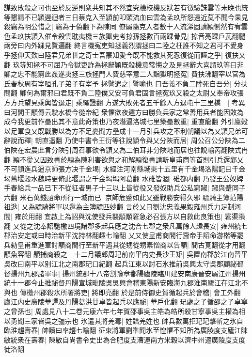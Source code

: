 謀致敗殺之可也至於反逆則衆共知其不然宜究檢校機反狀若有徵驗誅雲等未晩也統等懇請不已頴遲迴者三日蔡克入至頴前叩頭流血曰雲為孟玖所怨遠近莫不聞今果見殺竊為明公惜之|{
	竊為于偽翻下為陳同}
僚屬隨克入者數十人流涕固請頴惻然有宥雲色孟玖扶頴入催令殺雲耽夷機三族獄吏考掠孫拯數百兩踝骨見|{
	掠音亮踝戶瓦翻腿兩旁曰内外踝見賢遍翻}
終言機寃吏知拯義烈謂拯曰二陸之枉誰不知之君可不愛身乎拯仰天歎曰陸君兄弟世之奇士吾蒙知愛今既不能救其死忍復從而誣之乎|{
	復扶又翻}
玖等知拯不可屈乃令獄吏詐為拯辭頴既殺機意常悔之及見拯辭大喜謂玖等曰非卿之忠不能窮此姦遂夷拯三族拯門人費慈宰意二人詣獄明拯寃|{
	費扶沸翻宰以官為氏春秋周有宰咺孔子弟子有宰予}
拯譬遣之|{
	譬喻也}
曰吾義不負二陸死自吾分|{
	分扶問翻}
卿何為爾邪曰君既不負二陸僕又安可負君固言拯寃玖又殺之太尉乂奉帝攻張方方兵望見乘輿皆退走|{
	乘繩證翻}
方遂大敗死者五千餘人方退屯十三里橋　|{
	考異曰河間王顒傳云駛水橋今從帝紀}
衆懼欲夜遁方曰勝負兵家之常善用兵者能因敗為成今我更前作壘出其不意此奇策也乃夜潛逼洛城七里築壘數重|{
	重直龍翻}
外引廩穀以足軍食乂既戰勝以為方不足憂聞方壘成十一月引兵攻之不利朝議以為乂頴兄弟可辭說而釋|{
	朝直遥翻}
乃使中書令王衍等往說頴令與乂分陜而居|{
	周公召公分陜為二伯陜在宏農此言分陜引周召事欲令頴乂為二伯耳非分陜地而居也往說輸芮翻陜式冉翻}
頴不從乂因致書於頴為陳利害欲與之和解頴復書請斬皇甫商等首則引兵還鄴乂不可頴進兵逼京師張方决千金堨|{
	水經注河南縣城東十五里有千金堨洛陽記曰千金堨舊堰穀水魏時更脩此堰謂之千金堨堨阿葛翻}
水碓皆涸|{
	碓都内翻}
乃發王公奴婢手舂給兵一品已下不從征者男子十三以上皆從役又發奴助兵公私窮踧|{
	踧與蹙同子六翻}
米石萬錢詔命所行一城而已|{
	京師危蹙如此乂雖戰勝安得久邪}
驃騎主簿范陽祖逖|{
	乂為驃騎將軍以逖為主簿驃匹妙翻}
言於乂曰劉沈忠義果毅雍州兵力足制河間|{
	雍於用翻}
宜啟上為詔與沈使發兵襲顒顒窘急必召張方以自救此良策也|{
	窘渠隕翻}
乂從之沈奉詔馳檄四境諸郡多起兵應之沈合七郡之衆凡萬餘人趣長安|{
	雍州統七郡治安定或曰時治新平沈持林翻趣七喻翻}
乂又使皇甫商間行齎帝手詔命游楷等罷兵勅皇甫重進軍討顒商間行至新平遇其從甥從甥素憎商以告顒|{
	間古莧翻從才用翻顒魚容翻}
顒捕商殺之　十二月議郎周玘前南平内史長沙王矩|{
	吳置南郡於江南晉平吳改曰南平以别江北之南郡玘口紀翻}
起兵江東以討石氷推前吳興太守吳郡顧祕都督揚州九郡諸軍事|{
	揚州統郡十八帝割豫章鄱陽廬陵臨川建安南康晉安屬江州揚州統十一郡今止推祕督丹陽宣城毗陵吳吳興會稽東陽新安臨海九郡淮南廬江在江北不與也}
傳檄州郡殺氷所署將吏|{
	將即亮翻}
於是前侍御史賀循起兵於會稽|{
	會工外翻}
廬江内史廣陵華譚及丹陽葛洪甘卓皆起兵以應祕|{
	華戶化翻}
玘處之子循邵之子卓寧之曾孫也|{
	周處見八十二卷元康六年七年賀邵事吳主皓為皓所殺甘寧事吳主權為相以勇聞三家皆吳之彊宗也}
氷遣其將羌毒|{
	姓譜羌姓也}
帥兵數萬拒玘玘擊斬之氷自臨淮趨壽春|{
	帥讀曰率趨七喻翻}
征東將軍劉準聞氷至惶懼不知所為廣陵度支廬江陳敏統衆在壽春|{
	陳敏自尚書令史出為合肥度支漕運南方米穀以濟中州遷廣陵度支度徒洛翻}
